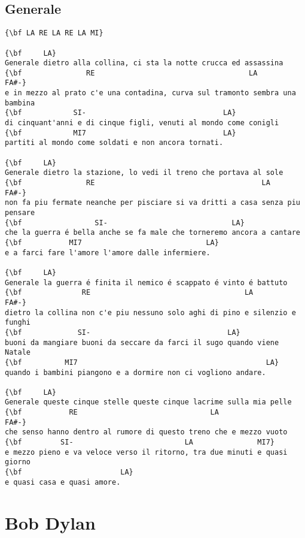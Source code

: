 \documentclass[a4paper]{article}
\begin{document}
\subsection{Generale} %
\label{sub:Generale}
\begin{Verbatim}[commandchars=\\\{\}]
{\bf LA RE LA RE LA MI}

{\bf     LA}
Generale dietro alla collina, ci sta la notte crucca ed assassina
{\bf               RE                                    LA                  FA#-}
e in mezzo al prato c'e una contadina, curva sul tramonto sembra una bambina
{\bf            SI-                                LA}
di cinquant'anni e di cinque figli, venuti al mondo come conigli
{\bf            MI7                                LA}
partiti al mondo come soldati e non ancora tornati.

{\bf     LA}
Generale dietro la stazione, lo vedi il treno che portava al sole
{\bf               RE                                       LA                FA#-}
non fa piu fermate neanche per pisciare si va dritti a casa senza piu pensare
{\bf                 SI-                             LA}
che la guerra é bella anche se fa male che torneremo ancora a cantare
{\bf           MI7                             LA}
e a farci fare l'amore l'amore dalle infermiere.

{\bf     LA}
Generale la guerra é finita il nemico é scappato é vinto é battuto
{\bf              RE                                    LA                FA#-}
dietro la collina non c'e piu nessuno solo aghi di pino e silenzio e funghi
{\bf             SI-                                LA}
buoni da mangiare buoni da seccare da farci il sugo quando viene Natale
{\bf          MI7                                            LA}
quando i bambini piangono e a dormire non ci vogliono andare.

{\bf     LA}
Generale queste cinque stelle queste cinque lacrime sulla mia pelle
{\bf           RE                               LA                FA#-}
che senso hanno dentro al rumore di questo treno che e mezzo vuoto
{\bf         SI-                          LA               MI7}
e mezzo pieno e va veloce verso il ritorno, tra due minuti e quasi giorno
{\bf                       LA}
e quasi casa e quasi amore.
\end{Verbatim}
\newpage
\section{Bob Dylan} %
\label{sec:Bob Dyl}
\end{document}
